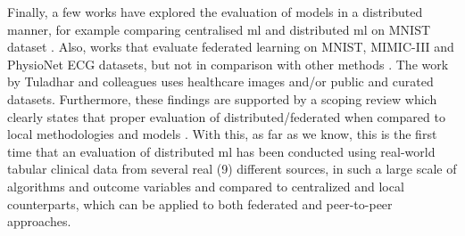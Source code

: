 Finally, a few works have explored the evaluation of models in a distributed manner, for example comparing  centralised \ac{ml} and distributed \ac{ml} on MNIST dataset \cite{performance_evaluation_1}. Also, works that evaluate federated learning on MNIST, MIMIC-III and PhysioNet ECG datasets, but not in comparison with other methods \cite{performance_evaluation_2}. The work by Tuladhar and colleagues \cite{distributed} uses healthcare images and/or public and curated datasets. Furthermore, these findings are supported by a scoping review which clearly states that proper  evaluation of distributed/federated when compared to local methodologies and models \cite{liFederatedDistributedLearning2023}. With this, as far as we know, this is the first time that an evaluation of distributed \ac{ml} has been conducted using real-world tabular clinical data from several real (9) different sources, in such a large scale of algorithms and outcome variables and compared to centralized and local counterparts, which can be applied to both federated and peer-to-peer approaches.